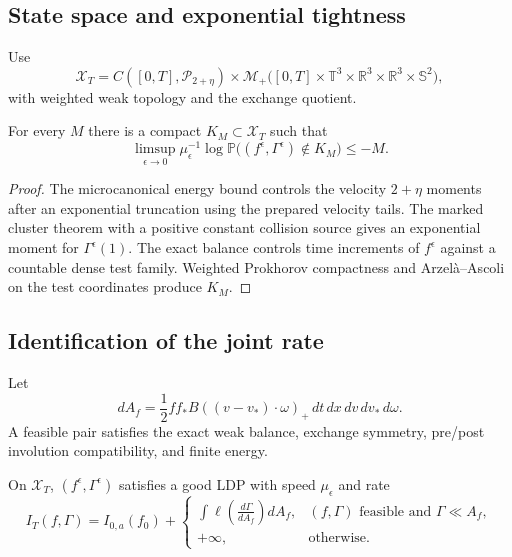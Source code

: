\subsection{State space and exponential tightness}

Use
\[
 \mathcal X_T=
 C([0,T],\mathcal P_{2+\eta})
 \times\mathcal M_+\big([0,T]\times\mathbb T^3
 \times\mathbb R^3\times\mathbb R^3\times\mathbb S^2\big),
\]
with weighted weak topology and the exchange quotient.

\begin{lemma}
\label{lem:rr2-b2-tight}
For every \(M\) there is a compact \(K_M\subset\mathcal X_T\) such that
\[
 \limsup_{\epsilon\to0}\mu_\epsilon^{-1}
 \log\mathbb P\big((f^\epsilon,\Gamma^\epsilon)\notin K_M\big)
 \le-M.
\]
\end{lemma}

\begin{proof}
The microcanonical energy bound controls the velocity \(2+\eta\) moments
after an exponential truncation using the prepared velocity tails.
The marked cluster theorem with a positive constant collision source gives
an exponential moment for \(\Gamma^\epsilon(1)\).  The exact balance controls
time increments of \(f^\epsilon\) against a countable dense test family.
Weighted Prokhorov compactness and Arzel\`a--Ascoli on the test coordinates
produce \(K_M\).
\end{proof}

\subsection{Identification of the joint rate}

Let
\[
 dA_f=\frac12 ff_*B((v-v_*)\cdot\omega)_+
 \,dt\,dx\,dv\,dv_*\,d\omega .
\]
A feasible pair satisfies the exact weak balance, exchange symmetry,
pre/post involution compatibility, and finite energy.

\begin{theorem}
\label{thm:rr2-b2-ldp}
On \(\mathcal X_T\), \((f^\epsilon,\Gamma^\epsilon)\) satisfies a good LDP
with speed \(\mu_\epsilon\) and rate
\[
 I_T(f,\Gamma)
 =
 I_{0,a}(f_0)+
 \begin{cases}
 \displaystyle\int
 \ell\!\left(\frac{d\Gamma}{dA_f}\right)dA_f,
 & (f,\Gamma)\text{ feasible and }\Gamma\ll A_f,\\[2ex]
 +\infty,&\text{otherwise}.
 \end{cases}
\]
\end{theorem}


